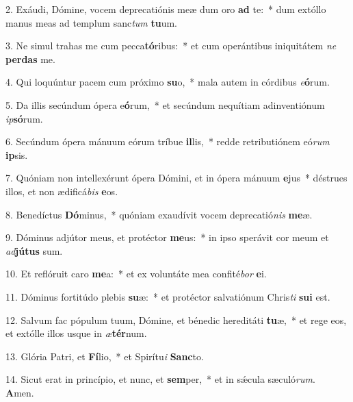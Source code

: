 2. Exáudi, Dómine, vocem deprecatiónis meæ dum oro \textbf{ad} te:~*  dum extóllo manus meas ad templum sanc\textit{tum} \textbf{tu}um.\

3. Ne simul trahas me cum pecca\textbf{tó}ribus:~*  et cum operántibus iniquitátem \textit{ne} \textbf{per}\textbf{das} me.\

4. Qui loquúntur pacem cum próximo \textbf{su}o,~*  mala autem in córdibus \textit{e}\textbf{ó}rum.\

5. Da illis secúndum ópera e\textbf{ó}rum,~*  et secúndum nequítiam adinventiónum \textit{ip}\textbf{só}rum.\

6. Secúndum ópera mánuum eórum tríbue \textbf{il}lis,~*  redde retributiónem eó\textit{rum} \textbf{ip}sis.\

7. Quóniam non intellexérunt ópera Dómini, et in ópera mánuum \textbf{e}jus~*  déstrues illos, et non ædificá\textit{bis} \textbf{e}os.\

8. Benedíctus \textbf{Dó}minus,~*  quóniam exaudívit vocem deprecatió\textit{nis} \textbf{me}æ.\

9. Dóminus adjútor meus, et protéctor \textbf{me}us:~*  in ipso sperávit cor meum et \textit{ad}\textbf{jú}\textbf{tus} sum.\

10. Et reflóruit caro \textbf{me}a:~*  et ex voluntáte mea confité\textit{bor} \textbf{e}i.\

11. Dóminus fortitúdo plebis \textbf{su}æ:~*  et protéctor salvatiónum Chris\textit{ti} \textbf{su}\textbf{i} est.\

12. Salvum fac pópulum tuum, Dómine, et bénedic hereditáti \textbf{tu}æ,~*  et rege eos, et extólle illos usque in \textit{æ}\textbf{tér}num.\

13. Glória Patri, et \textbf{Fí}lio,~*  et Spirítu\textit{i} \textbf{Sanc}to.\

14. Sicut erat in princípio, et nunc, et \textbf{sem}per,~*  et in sǽcula sæculó\textit{rum}. \textbf{A}men.\

